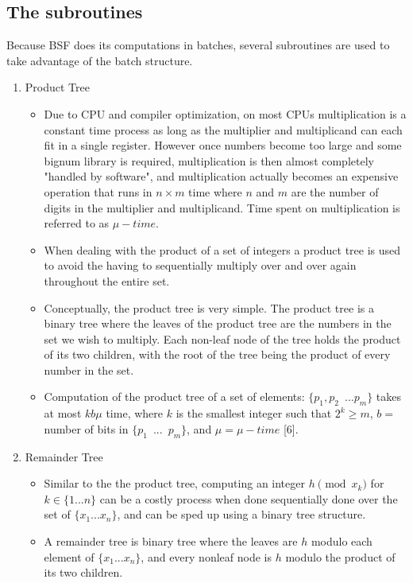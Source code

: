 \documentclass{article}
\begin{document}
  \subsection{The subroutines}
  Because BSF does its computations in batches, several subroutines are used to take advantage of the batch structure.
    \begin{enumerate}
      \item Product Tree \\
        \begin{itemize}
          \item Due to CPU and compiler optimization, on most CPUs multiplication is a constant time process as long as the multiplier and multiplicand can each fit in a single register.  However once numbers become too large and some bignum library is required, multiplication is then almost completely "handled by software", and multiplication actually becomes an expensive operation that runs in $n \times m$ time where $n$ and $m$ are the number of digits in the multiplier and multiplicand.  Time spent on multiplication is referred to as $\mu -time$.
          \item When dealing with the product of a set of integers a product tree is used to avoid the having to sequentially multiply over and over again throughout the entire set.
          \item Conceptually, the product tree is very simple.  The product tree is a binary tree where the leaves of the product tree are the numbers in the set we wish to multiply.  Each non-leaf node of the tree holds the product of its two children, with the root of the tree being the product of every number in the set.
          \item Computation of the product tree of a set of elements: $\{p_1, p_2 \enspace ... p_m\}$ takes at most $kb\mu$ time, where $k$ is the smallest integer such that $2^k \geq m$, $b =$ number of bits in $\{p_1 \enspace ... \enspace p_m\}$, and $\mu = \mu -time$ [6].
        \end{itemize}
      \item Remainder Tree \\
        \begin{itemize}
          \item Similar to the the product tree, computing an integer $h \pmod {x_k}$ for $k \in \{1 ... n\}$ can be a costly process when done sequentially done over the set of $\{x_1 ... x_n\}$, and can be sped up using a binary tree structure.
          \item A remainder tree is binary tree where the leaves are $h$ modulo each element of $\{x_1 ... x_n\}$, and every nonleaf node is $h$ modulo the product of its two children.

\end{itemize}
\end{enumerate}
\end{document}
